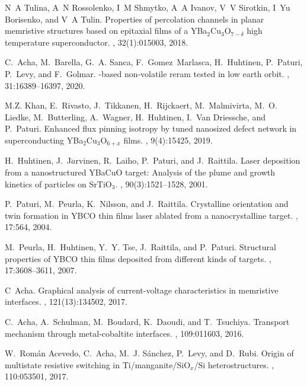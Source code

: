 \documentclass[square,aip,preprint,showkeys,superscriptaddress]{revtex4}
\begin{document}
\begin{thebibliography}{10}
	N~A Tulina, A~N Rossolenko, I~M Shmytko, A~A Ivanov, V~V Sirotkin, I~Yu
	Borisenko, and V~A Tulin.
	\newblock Properties of percolation channels in planar memristive structures
	based on epitaxial films of a {YBa$_2$Cu$_3$O$_{7-\delta}$} high
	temperature superconductor.
	, 32(1):015003, 2018.
	
	C.~Acha, M.~Barella, G.~A. Sanca, F.~Gomez~Marlasca, H.~Huhtinen, P.~Paturi,
	P.~Levy, and F.~Golmar.
	-based non-volatile reram tested in low earth orbit.
	,
	31:16389--16397, 2020.
	
	M.Z. Khan, E.~Rivasto, J.~Tikkanen, H.~Rijckaert, M.~Malmivirta, M.~O. Liedke,
	M.~Butterling, A.~Wagner, H.~Huhtinen, I.~Van Driessche, and P.~Paturi.
	\newblock Enhanced flux pinning isotropy by tuned nanosized defect network in
	superconducting {YBa$_2$Cu$_3$O$_{6+x}$} films.
	, 9(4):15425, 2019.
	
	H.~Huhtinen, J.~J$\ddot{a}$rvinen, R.~Laiho, P.~Paturi, and J.~Raittila.
	\newblock Laser deposition from a nanostructured {YBaCuO} target: Analysis of
	the plume and growth kinetics of particles on {SrTiO$_3$}.
	, 90(3):1521--1528, 2001.
	
	P.~Paturi, M.~Peurla, K.~Nilsson, and J.~Raittila.
	\newblock Crystalline orientation and twin formation in {YBCO} thin films laser
	ablated from a nanocrystalline target.
	, 17:564, 2004.
	
	M.~{Peurla}, H.~{Huhtinen}, Y.~Y. {Tse}, J.~{Raittila}, and P.~{Paturi}.
	\newblock Structural properties of {YBCO} thin films deposited from different
	kinds of targets.
	, 17:3608--3611,
	2007.
	
	C~Acha.
	\newblock Graphical analysis of current-voltage characteristics in memristive
	interfaces.
	, 121(13):134502, 2017.
	
	C.~Acha, A.~Schulman, M.~Boudard, K.~Daoudi, and T.~Tsuchiya.
	\newblock Transport mechanism through metal-cobaltite interfaces.
	, 109:011603, 2016.
	
	W.~Rom\'an Acevedo, C.~Acha, M.~J. S\'anchez, P.~Levy, and D.~Rubi.
	\newblock Origin of multistate resistive switching in {Ti/manganite/SiO$_x$/Si}
	heterostructures.
	, 110:053501, 2017.
	

\end{thebibliography}
\end{document}
